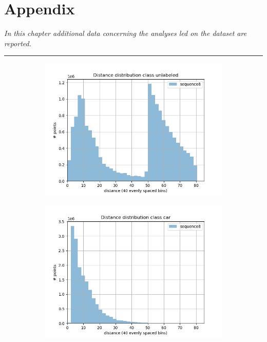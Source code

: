 \chapter{Appendix}\label{ch:appendix}
\textit{In this chapter additional data concerning the analyses led on the dataset are reported.}
\vspace{0.25cm}
\par\fancybreak{$***$}\par
\vspace{0.35cm}

\begin{figure}[h]
 \centering
     \begin{subfigure}[b]{0.24\textwidth}
         \centering
         \includegraphics[width=\textwidth]{Figures/Chapter4/dist-height/dist/test/class0.png}
     \end{subfigure}
     \hfill
     \begin{subfigure}[b]{0.24\textwidth}
         \centering
         \includegraphics[width=\textwidth]{Figures/Chapter4/dist-height/dist/test/class1.png}

\end{subfigure}
\end{figure}

